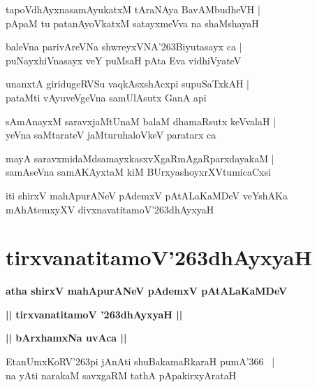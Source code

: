 \documentclass[twoside,12pt,openright]{book}
\def\S{\char'263}
\newcounter{shloka}[chapter]
\def\uvaca#1{\centerline{{\large\textbf{#1}}}}
\begin{document}
\begin{shloka}%
tapoVdhAyxnasamAyukatxM tAraNAya BavAMbudheVH |\\
pApaM tu patanAyoVkatxM satayxmeVva na shaMshayaH 
\end{shloka}

\begin{shloka}%
baleVna parivAreVNa shwreyxVNA\S Biyutasayx ca |\\
puNayxhiVnasayx veY puMsaH pAta Eva vidhiVyateV 
\end{shloka}

\begin{shloka}%
unanxtA giridugeRVSu vaqkAsxshAcxpi supuSaTxkAH |\\
pataMti vAyuveVgeVna samUlAsutx GanA api
\end{shloka}

\begin{shloka}%
sAmAnayxM saravxjaMtUnaM balaM dhamaRsutx keVvalaH |\\
yeVna saMtarateV jaMturuhaloVkeV paratarx ca 
\end{shloka}

\begin{shloka}%
mayA saravxmidaMdsamayxkasxvXgaRmAgaRparxdayakaM |\\
samAseVna samAKAyxtaM kiM BUrxyashoyxrXVtumicaCxsi 
\end{shloka}

\begin{center}
iti shirxV mahApurANeV pAdemxV pAtALaKaMDeV veYshAKa mAhAtemxyXV 
divxnavatitamoV\S dhAyxyaH
\end{center}

\chapter{tirxvanatitamoV\S dhAyxyaH}

\begin{center}
{\LARGE\bfseries atha shirxV mahApurANeV pAdemxV pAtALaKaMDeV }
\end{center}

\begin{center}         
{\LARGE\bfseries || tirxvanatitamoV \S dhAyxyaH ||}
\end{center}

\uvaca{|| bArxhamxNa uvAca ||}

\begin{shloka}%
EtanUmxKoRV\S pi jAnAti shuBakamaRkaraH pumA\char'366 ~|\\
na yAti narakaM savxgaRM tathA pApakirxyArataH 
\end{shloka}
\end{document}
